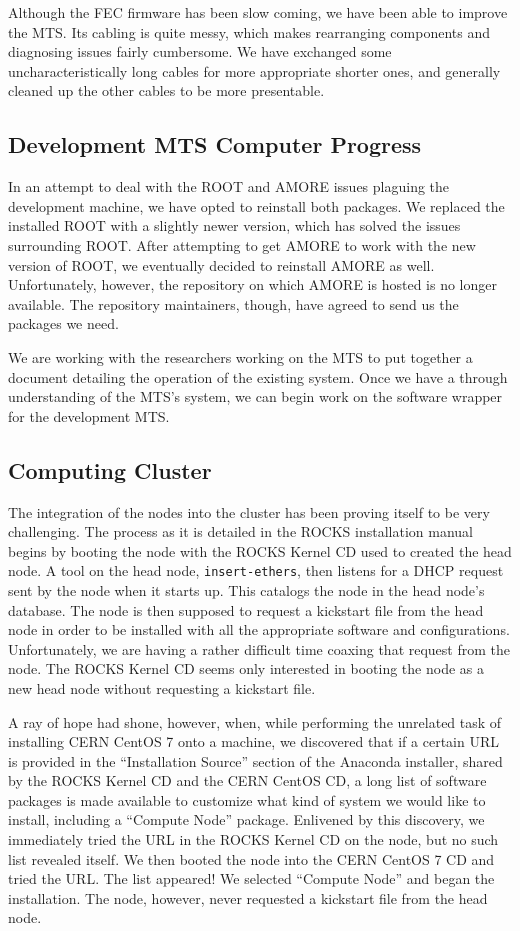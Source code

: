 \documentclass[12pt]{article}
\newcommand\tab[1][1cm]{\hspace*{#1}}
\begin{document}
\tab Although the FEC firmware has been slow coming, we have been able to improve the
MTS. Its cabling is quite messy, which makes rearranging components and
diagnosing issues fairly cumbersome. We have exchanged some uncharacteristically
long cables for more appropriate shorter ones, and generally cleaned up the
other cables to be more presentable.

\subsection{Development MTS Computer Progress}

\tab In an attempt to deal with the ROOT and AMORE issues plaguing the
development machine, we have opted to reinstall both packages. We replaced the
installed ROOT with a slightly newer version, which has solved the issues
surrounding ROOT. After attempting to get AMORE to work with the new version of
ROOT, we eventually decided to reinstall AMORE as well. Unfortunately, however,
the repository on which AMORE is hosted is no longer available. The repository
maintainers, though, have agreed to send us the packages we need.

\tab We are working with the researchers working on the MTS to put together a
document detailing the operation of the existing system. Once we have a
through understanding of the MTS's system, we can begin work on the software
wrapper for the development MTS.

\subsection{Computing Cluster}

\tab The integration of the nodes into the cluster has been proving itself to be
very challenging. The process as it is detailed in the ROCKS installation manual
begins by booting the node with the ROCKS Kernel CD used to created the head
node. A tool on the head node, {\tt insert-ethers}, then listens
for a DHCP request sent by the node when it starts up. This catalogs the node in
the head node's database. The node is then supposed to request a kickstart file
from the head node in order to be installed with all the appropriate software
and configurations. Unfortunately, we are having a rather difficult time coaxing
that request from the node. The ROCKS Kernel CD seems only interested in booting
the node as a new head node without requesting a kickstart file.

\tab A ray of hope had shone, however, when, while performing the unrelated task
of installing CERN CentOS 7 onto a machine, we discovered that if a certain URL
is provided in the ``Installation Source'' section of the Anaconda installer,
shared by the ROCKS Kernel CD and the CERN CentOS CD, a long list of software
packages is made available to customize what kind of system we would like to
install, including a ``Compute Node'' package. Enlivened by this discovery, we
immediately tried the URL in the ROCKS Kernel CD on the node, but no such list
revealed itself. We then booted the node into the CERN CentOS 7 CD and tried the
URL. The list appeared! We selected ``Compute Node'' and began the
installation. The node, however, never requested a kickstart file from the head
node. 
\end{document}
